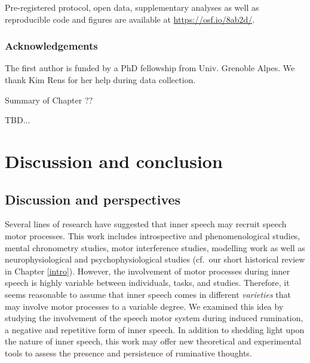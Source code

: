 \documentclass[a4paper,12pt,twoside,openright,oldfontcommands]{memoir}
\newcommand{\initial}[1]{
	\lettrine[lines=3,lhang=0.33,nindent=0em]{
		\color{gray}
     		{\textsc{#1}}}{}}
\newcommand\getcurrentref[1]{
 \ifnumequal{\value{#1}}{0}
  {??}
  {\the\value{#1}}
}
\begin{document}
Pre-registered protocol, open data, supplementary analyses as well as reproducible code and figures are available at \url{https://osf.io/8ab2d/}.

\hypertarget{acknowledgements-4}{%
\section{Acknowledgements}\label{acknowledgements-4}}

The first author is funded by a PhD fellowship from Univ. Grenoble Alpes. We thank Kim Rens for her help during data collection.

\newpage

\begin{vplace}[1]

\begin{summary}{Summary of Chapter\getcurrentref{chapter}}

TBD...

\end{summary}

\end{vplace}

\hypertarget{part-discussion-and-conclusion}{%
\part{Discussion and conclusion}\label{part-discussion-and-conclusion}}

\hypertarget{chap8}{%
\chapter{Discussion and perspectives}\label{chap8}}

\initial{S}everal lines of research have suggested that inner speech may recruit speech motor processes. This work includes introspective and phenomenological studies, mental chronometry studies, motor interference studies, modelling work as well as neurophysiological and psychophysiological studies (cf.~our short historical review in Chapter \ref{intro}). However, the involvement of motor processes during inner speech is highly variable between individuals, tasks, and studies. Therefore, it seems reasonable to assume that inner speech comes in different \emph{varieties} that may involve motor processes to a variable degree. We examined this idea by studying the involvement of the speech motor system during induced rumination, a negative and repetitive form of inner speech. In addition to shedding light upon the nature of inner speech, this work may offer new theoretical and experimental tools to assess the presence and persistence of ruminative thoughts.
\end{document}
